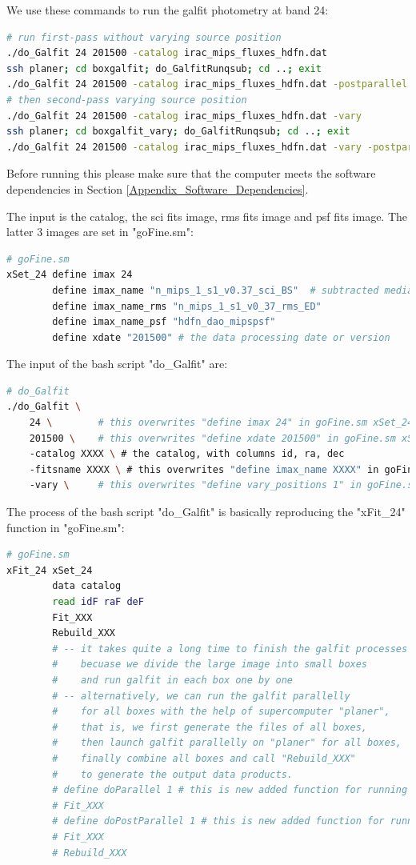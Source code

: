\documentclass[11pt,a4paper]{article}
\begin{document}
We use these commands to run the galfit photometry at band 24:

\begin{lstlisting}[language=bash]
# run first-pass without varying source position
./do_Galfit 24 201500 -catalog irac_mips_fluxes_hdfn.dat
ssh planer; cd boxgalfit; do_GalfitRunqsub; cd ..; exit
./do_Galfit 24 201500 -catalog irac_mips_fluxes_hdfn.dat -postparallel
# then second-pass varying source position
./do_Galfit 24 201500 -catalog irac_mips_fluxes_hdfn.dat -vary
ssh planer; cd boxgalfit_vary; do_GalfitRunqsub; cd ..; exit
./do_Galfit 24 201500 -catalog irac_mips_fluxes_hdfn.dat -vary -postparallel
\end{lstlisting}

Before running this please make sure that the computer meets the software dependencies in Section \ref{Appendix_Software_Dependencies}. 

The input is the catalog, the sci fits image, rms fits image and psf fits image. The latter 3 images are set in "goFine.sm": 

\begin{lstlisting}[language=bash]
# goFine.sm
xSet_24	define imax 24
		define imax_name "n_mips_1_s1_v0.37_sci_BS"  # subtracted median smooth back
		define imax_name_rms "n_mips_1_s1_v0_37_rms_ED"
		define imax_name_psf "hdfn_dao_mipspsf"
		define xdate "201500" # the data processing date or version
\end{lstlisting}

The input of the bash script "do\_Galfit" are: 

\begin{lstlisting}[language=bash]
# do_Galfit
./do_Galfit \
	24 \ 		# this overwrites "define imax 24" in goFine.sm xSet_24
	201500 \ 	# this overwrites "define xdate 201500" in goFine.sm xSet_24
	-catalog XXXX \ # the catalog, with columns id, ra, dec
	-fitsname XXXX \ # this overwrites "define imax_name XXXX" in goFine.sm xSet_24
	-vary \ 	# this overwrites "define vary_positions 1" in goFine.sm xSet_24
\end{lstlisting}

The process of the bash script "do\_Galfit" is basically reproducing the "xFit\_24" function in "goFine.sm":

\begin{lstlisting}[language=bash]
# goFine.sm
xFit_24	xSet_24
		data catalog
		read idF raF deF
		Fit_XXX
		Rebuild_XXX
		# -- it takes quite a long time to finish the galfit processes
		#    becuase we divide the large image into small boxes 
		#    and run galfit in each box one by one
		# -- alternatively, we can run the galfit parallelly 
		#    for all boxes with the help of supercomputer "planer", 
		#    that is, we first generate the files of all boxes, 
		#    then launch galfit parallelly on "planer" for all boxes, 
		#    finally combine all boxes and call "Rebuild_XXX"
		#    to generate the output data products. 
		# define doParallel 1 # this is new added function for running parallely
		# Fit_XXX
		# define doPostParallel 1 # this is new added function for running parallely
		# Fit_XXX
		# Rebuild_XXX
\end{lstlisting}
\end{document}
